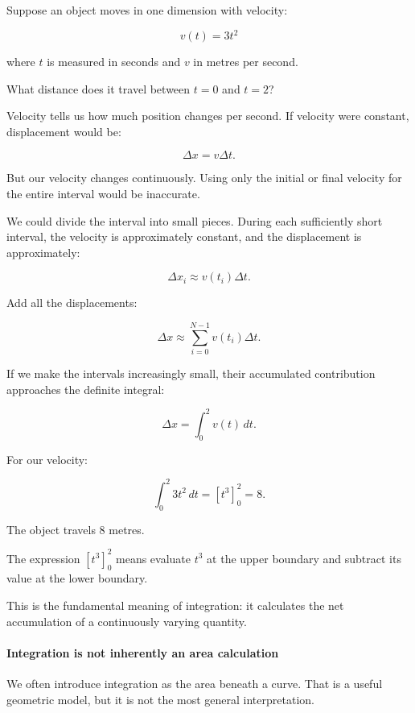 \hypertarget{02-foundations-ii-ch022-integration-means-accumulating-infinitesimal-contributions}{}

Suppose an object moves in one dimension with velocity:

\[
v(t)=3t^2
\]

where \(t\) is measured in seconds and \(v\) in metres per second.

What distance does it travel between \(t=0\) and \(t=2\)?

Velocity tells us how much position changes per second. If velocity were constant, displacement would be:

\[
\Delta x=v\Delta t.
\]

But our velocity changes continuously. Using only the initial or final velocity for the entire interval would be inaccurate.

We could divide the interval into small pieces. During each sufficiently short interval, the velocity is approximately constant, and the displacement is approximately:

\[
\Delta x_i\approx v(t_i)\Delta t.
\]

Add all the displacements:

\[
\Delta x\approx\sum_{i=0}^{N-1}v(t_i)\Delta t.
\]

If we make the intervals increasingly small, their accumulated contribution approaches the definite integral:

\[
\boxed{\Delta x=\int_0^2v(t)\,dt}.
\]

For our velocity:

\[
\int_0^2 3t^2\,dt = \left[t^3\right]_0^2=8.
\]

The object travels 8 metres.

The expression \([t^3]_0^2\) means evaluate \(t^3\) at the upper boundary and subtract its value at the lower boundary.

This is the fundamental meaning of integration: it calculates the net accumulation of a continuously varying quantity.

\paragraph{Integration is not inherently an area calculation}\label{02-foundations-ii-ch022-integration-is-not-inherently-an-area-calculation}

\hypertarget{02-foundations-ii-ch022-integration-is-not-inherently-an-area-calculation}{}

We often introduce integration as the area beneath a curve. That is a useful geometric model, but it is not the most general interpretation.

